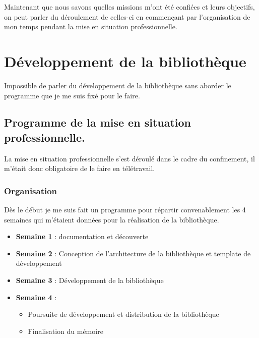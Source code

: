 \documentclass[11pt,a4paper,krantz2,11pt,oneside]{krantz}
\providecommand{\tightlist}{%
  \setlength{\itemsep}{0pt}\setlength{\parskip}{0pt}}
\begin{document}
Maintenant que nous savons quelles missions m'ont été confiées et leurs objectifs, on peut parler du déroulement de celles-ci en commençant par l'organisation de mon temps pendant la mise en situation professionnelle.

\hypertarget{dev}{%
\chapter{Développement de la bibliothèque}\label{dev}}

Impossible de parler du développement de la bibliothèque sans aborder le programme que je me suis fixé pour le faire.

\hypertarget{programme-de-la-mise-en-situation-professionnelle.}{%
\section{Programme de la mise en situation professionnelle.}\label{programme-de-la-mise-en-situation-professionnelle.}}

La mise en situation professionnelle s'est déroulé dans le cadre du confinement, il m'était donc obligatoire de le faire en télétravail.

\hypertarget{organisation}{%
\subsection{Organisation}\label{organisation}}

Dès le début je me suis fait un programme pour répartir convenablement les 4 semaines qui m'étaient données pour la réalisation de la bibliothèque.

\begin{itemize}
\tightlist
\item
  \textbf{Semaine 1} : documentation et découverte
\item
  \textbf{Semaine 2} : Conception de l'architecture de la bibliothèque et template de développement
\item
  \textbf{Semaine 3} : Développement de la bibliothèque
\item
  \textbf{Semaine 4} :

  \begin{itemize}
  \tightlist
  \item
    Poursuite de développement et distribution de la bibliothèque
  \item
    Finalisation du mémoire
  \end{itemize}
\end{itemize}
\end{document}

